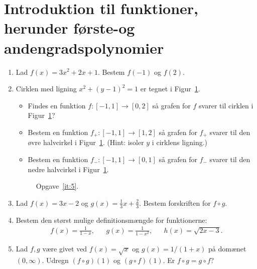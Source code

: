 \section{Introduktion til funktioner, herunder første-og andengradspolynomier}
\begin{enumerate}
	
	\item Lad $f(x)=3x^2+2x+1$. Bestem $f(-1)$ og $f(2)$.
	
	\item \label{it:5} Cirklen med ligning $x^{2} +(y-1)^{2}=1$ er tegnet i Figur~\ref{fig:5}.
	\begin{itemize}
		\item Findes en funktion $f\colon [-1,1]\to [0,2]$ så grafen for $f$ svarer til cirklen i Figur~\ref{fig:5}?
		\item Bestem en funktion $f_+\colon [-1,1]\to [1,2]$ så grafen for $f_+$ svarer til den øvre halvcirkel i Figur~\ref{fig:5}. (Hint: isoler $y$ i cirklens ligning.)
		\item Bestem en funktion $f_-\colon [-1,1]\to [0,1]$ så grafen for $f_-$ svarer til den nedre halvcirkel i Figur~\ref{fig:5}.
	\end{itemize}	
	\begin{figure}
		\centering
		\caption{Opgave~\ref{it:5}.}
		\label{fig:5}
	\end{figure}

	
	\item Lad $f(x)=3x-2$ og $g(x)=\frac{1}{3}x+\frac{2}{3}$. Bestem forskriften for $f\circ g$.

	\item Bestem den størst mulige definitionsmængde for funktionerne:
	\begin{align*}
	f(x)=\frac{1}{1-x},&& g(x)=\frac{1}{1-x^2},&& h(x)=\sqrt{2x-3}.
	\end{align*}
	
	
	\item  Lad $f,g$ være givet ved $f(x)=\sqrt{x}$ og $g(x)=1/(1+x)$ på domænet $(0,\infty)$. Udregn $(f\circ g)(1)$ og $(g\circ f)(1)$. Er $f\circ g=g\circ f$?
	

\end{enumerate}
